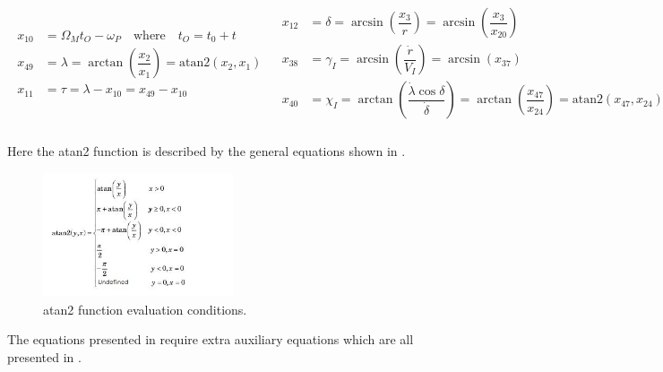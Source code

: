  \begin{align} \label{eq:transAnglAux}
\begin{split}
x_{10} &= \Omega_{M}t_{O}-\omega_{P} \quad \text{where} \quad t_{O}=t_{0}+t \\
x_{49} &= \lambda = \arctan\left(\dfrac{x_{2}}{x_{1}}\right) = \text{atan2}\left(x_{2},x_{1}\right)\\
x_{11} &= \tau = \lambda - x_{10} = x_{49}-x_{10} \\
\end{split}
&
\begin{split}
x_{12} &= \delta = \arcsin\left(\dfrac{x_{3}}{r}\right) = \arcsin\left(\dfrac{x_{3}}{x_{20}}\right)\\
x_{38} &= \gamma_{I} = \arcsin\left(\dfrac{\dot{r}}{V_{I}}\right) = \arcsin\left(x_{37}\right)\\
x_{40} &= \chi_{I} = \arctan\left(\dfrac{\dot{\lambda }\cos\delta}{\dot{\delta}}\right)=\arctan\left(\dfrac{x_{47}}{x_{24}}\right)=\text{atan2}\left(x_{47},x_{24}\right) \\
\end{split}
\end{align} 

Here the atan2 function is described by the general equations shown in .

\begin{figure}[!ht]
\centering
\includegraphics[width=0.5\textwidth]{figures/reference_frames/atan2_guilhaire2013.jpg}
\caption{atan2 function evaluation conditions.}
\label{fig:atan2_guilhaire2013}
\end{figure}

The equations presented in  require extra auxiliary equations which are all presented in .
 
